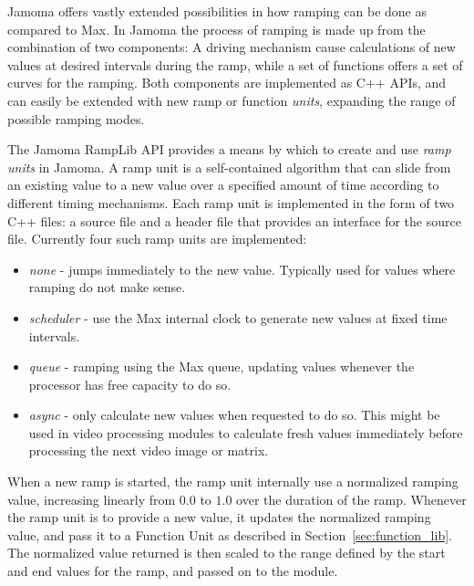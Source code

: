 \documentclass{article}
\begin{document}

Jamoma offers vastly extended possibilities in how ramping can be done as compared to Max. In Jamoma the process of ramping is made up from the combination of two components: A driving mechanism cause calculations of new values at desired intervals during the ramp, while a set of functions offers a set of curves for the ramping. Both components are implemented as C++ APIs, and can easily be extended with new ramp or function \emph{units}, expanding the range of possible ramping modes. %

The Jamoma RampLib API provides a means by which to create and use \emph{ramp units} in Jamoma.  A ramp unit is a self-contained algorithm that can slide from an existing value to a new value over a specified amount of time according to different timing mechanisms. Each ramp unit is implemented in the form of two C++ files: a source file and a header file that provides an interface for the source file. Currently four such ramp units are implemented:

\begin{itemize}
	\item \emph{none} - jumps immediately to the new value. Typically used for values where ramping do not make sense.
	\item \emph{scheduler} - use the Max internal clock to generate new values at fixed time intervals.
	\item \emph{queue} - ramping using the Max queue, updating values whenever the processor has free capacity to do so.
	\item \emph{async} - only calculate new values when requested to do so. This might be used in video processing modules to calculate fresh values immediately before processing the next video image or matrix.
\end{itemize}

When a new ramp is started, the ramp unit internally use a normalized ramping value, increasing linearly from $0.0$ to $1.0$ over the duration of the ramp. Whenever the ramp unit is to provide a new value, it updates the normalized ramping value, and pass it to a Function Unit as described in Section~\ref{sec:function_lib}. The normalized value returned is then scaled to the range defined by the start and end values for the ramp, and passed on to the module.
\end{document}
